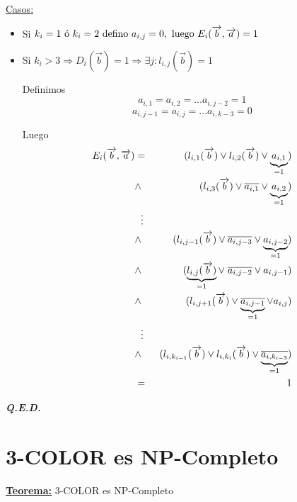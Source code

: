 \documentclass[12pt,a4paper]{report}
\newcommand{\QED}{\hfill \textit{\textbf{Q.E.D.}}}
\begin{document}
					\vspace{3mm}
					\underline{Casos:}
					\begin{itemize}
						\item Si $k_{i} = 1 \textup{ ó } k_{i} = 2 \textup{ defino } a_{i, j} = 0, \textup{ luego } E_{i}(\overrightarrow{b}, \overrightarrow{a}) = 1$
						\item Si $k_{i} > 3 \Rightarrow D_{i}(\overrightarrow{b}) = 1 \Rightarrow \exists j : l_{i, j}(\overrightarrow{b}) = 1$

							\par Definimos
								\[ a_{i, 1} = a_{i, 2} = \dotsc a_{i, j-2} = 1 \]
								\[ a_{i, j-1} = a_{i, j} = \dotsc a_{i, k-3} = 0 \]

							\par Luego
							\begin{eqnarray}
								\nonumber E_{i}(\overrightarrow{b}, \overrightarrow{a}) &=& (l_{i, 1}(\overrightarrow{b}) \vee l_{i, 2}(\overrightarrow{b}) \vee \underbrace{a_{i, 1}}_{= 1}) \\
								\nonumber &\wedge & (l_{i, 3}(\overrightarrow{b}) \vee \overline{a_{i, 1}} \vee \underbrace{a_{i, 2}}_{=1}) \\
								\nonumber &\vdotswithin{\ldots}& \\
								\nonumber &\wedge & (l_{i, j-1}(\overrightarrow{b}) \vee \overline{a_{i, j-3}} \vee \underbrace{a_{i, j-2}}_{=1}) \\
								\nonumber &\wedge & (\underbrace{l_{i, j}(\overrightarrow{b})}_{=1} \vee \; \overline{a_{i, j-2}} \vee a_{i, j-1}) \\
								\nonumber &\wedge & (l_{i, j+1}(\overrightarrow{b}) \vee \underbrace{\overline{a_{i, j-1}}}_{=1} \vee a_{i, j}) \\
								\nonumber &\vdotswithin{\ldots}& \\
								\nonumber &\wedge & (l_{i, k_{i-1}}(\overrightarrow{b}) \vee l_{i, k_{i}}(\overrightarrow{b}) \vee \underbrace{\overline{a_{i, k_{i-3}}}}_{=1}) \\
								\nonumber &=& 1
							\end{eqnarray}
					\end{itemize}

		\QED

	\section{3-COLOR es NP-Completo}
		\textbf{\underline{Teorema:}} 3-COLOR es NP-Completo
\end{document}
